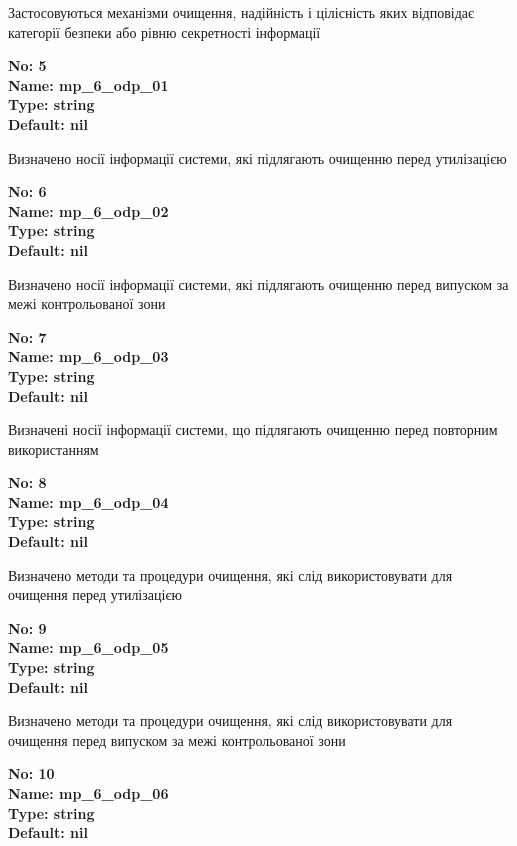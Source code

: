 \documentclass{article}
\begin{document}
{\footnotesize Застосовуються механізми очищення, надійність і цілісність яких відповідає категорії безпеки або рівню секретності інформації}


{\footnotesize\bfseries
No: 5\\
Name: mp\_\allowbreak{}6\_\allowbreak{}odp\_\allowbreak{}01\\
Type: string\\
Default: nil
}

{\footnotesize Визначено носії інформації системи, які підлягають очищенню перед утилізацією}


{\footnotesize\bfseries
No: 6\\
Name: mp\_\allowbreak{}6\_\allowbreak{}odp\_\allowbreak{}02\\
Type: string\\
Default: nil
}

{\footnotesize Визначено носії інформації системи, які підлягають очищенню перед випуском за межі контрольованої зони}


{\footnotesize\bfseries
No: 7\\
Name: mp\_\allowbreak{}6\_\allowbreak{}odp\_\allowbreak{}03\\
Type: string\\
Default: nil
}

{\footnotesize Визначені носії інформації системи, що підлягають очищенню перед повторним використанням}


{\footnotesize\bfseries
No: 8\\
Name: mp\_\allowbreak{}6\_\allowbreak{}odp\_\allowbreak{}04\\
Type: string\\
Default: nil
}

{\footnotesize Визначено методи та процедури очищення, які слід використовувати для очищення перед утилізацією}


{\footnotesize\bfseries
No: 9\\
Name: mp\_\allowbreak{}6\_\allowbreak{}odp\_\allowbreak{}05\\
Type: string\\
Default: nil
}

{\footnotesize Визначено методи та процедури очищення, які слід використовувати для очищення перед випуском за межі контрольованої зони}


{\footnotesize\bfseries
No: 10\\
Name: mp\_\allowbreak{}6\_\allowbreak{}odp\_\allowbreak{}06\\
Type: string\\
Default: nil
}
\end{document}
